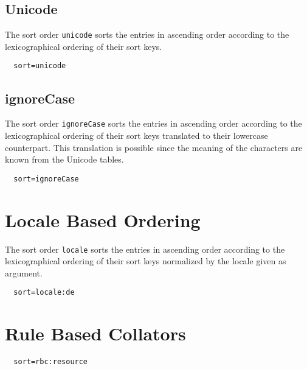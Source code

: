 \subsection{Unicode}

The sort order \texttt{unicode} sorts the entries in ascending order
according to the lexicographical ordering of their sort keys.

\begin{verbatim}
  sort=unicode
\end{verbatim}

\subsection{ignoreCase}

The sort order \texttt{ignoreCase} sorts the entries in ascending order
according to the lexicographical ordering of their sort keys
translated to their lowercase counterpart. This translation is
possible since the meaning of the characters are known from the
Unicode tables.

\begin{verbatim}
  sort=ignoreCase
\end{verbatim}

\section{Locale Based Ordering}

The sort order \texttt{locale} sorts the entries in ascending order
according to the lexicographical ordering of their sort keys
normalized by the locale given as argument.

\begin{verbatim}
  sort=locale:de
\end{verbatim}

\ifdraft\else
\section{Rule Based Collators}

\begin{verbatim}
  sort=rbc:resource
\end{verbatim}

\INCOMPLETE



\fi

\endinput
%
